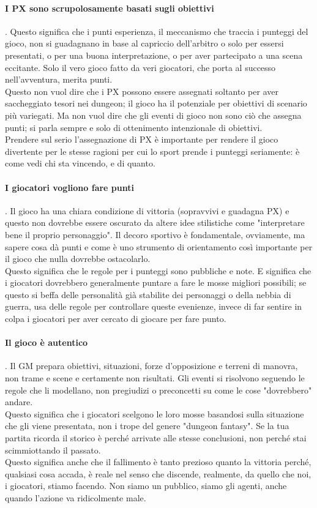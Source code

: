 \paragraph{I PX sono scrupolosamente basati sugli obiettivi}. Questo significa che i punti esperienza, il meccanismo che traccia i punteggi del gioco, non si guadagnano in base al capriccio dell'arbitro o solo per essersi presentati, o per una buona interpretazione, o per aver partecipato a una scena eccitante. Solo il vero gioco fatto da veri giocatori, che porta al successo nell'avventura, merita punti.\\
Questo non vuol dire che i PX possono essere assegnati soltanto per aver saccheggiato tesori nei dungeon; il gioco ha il potenziale per obiettivi di scenario più variegati. Ma non vuol dire che gli eventi di gioco non sono ciò che assegna punti; si parla sempre e solo di ottenimento intenzionale di obiettivi.\\
Prendere sul serio l'assegnazione di PX è importante per rendere il gioco divertente per le stesse ragioni per cui lo sport prende i punteggi seriamente: è come vedi chi sta vincendo, e di quanto.

\paragraph{I giocatori vogliono fare punti}. Il gioco ha una chiara condizione di vittoria (sopravvivi e guadagna PX) e questo non dovrebbe essere oscurato da altere idee stilistiche come "interpretare bene il proprio personaggio". Il decoro sportivo è fondamentale, ovviamente, ma sapere cosa dà punti e come è uno strumento di orientamento così importante per il gioco che nulla dovrebbe ostacolarlo.\\
Questo significa che le regole per i punteggi sono pubbliche e note. E significa che i giocatori dovrebbero generalmente puntare a fare le mosse migliori possibili; se questo si beffa delle personalità già stabilite dei personaggi o della nebbia di guerra, usa delle regole per controllare queste evenienze, invece di far sentire in colpa i giocatori per aver cercato di giocare per fare punto.

\paragraph{Il gioco è autentico}. Il GM prepara obiettivi, situazioni, forze d'opposizione e terreni di manovra, non trame e scene e certamente non risultati. Gli eventi si risolvono seguendo le regole che li modellano, non pregiudizi o preconcetti su come le cose "dovrebbero" andare.\\
Questo significa che i giocatori scelgono le loro mosse basandosi sulla situazione che gli viene presentata, non i trope del genere "dungeon fantasy". Se la tua partita ricorda il \dnd storico è perché arrivate alle stesse conclusioni, non perché stai scimmiottando il passato.\\
Questo significa anche che il fallimento è tanto prezioso quanto la vittoria perché, qualsiasi cosa accada, è reale nel senso che discende, realmente, da quello che noi, i giocatori, stiamo facendo. Non siamo un pubblico, siamo gli agenti, anche quando l'azione va ridicolmente male.

